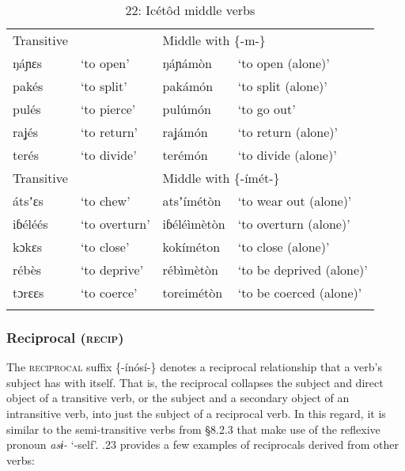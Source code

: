\begin{table}
\caption{22: Icétôd middle verbs}
\label{tab:8}


\begin{tabularx}{\textwidth}{XXXX}
\lsptoprule

Transitive &  & \multicolumn{2}{X}{Middle with \{-m-\}}\\
ŋáɲɛs & ‘to open’ & ŋáɲámòn & ‘to open (alone)’\\
pakés & ‘to split’ & pakámón & ‘to split (alone)’\\
pulés & ‘to pierce’ & pulúmón & ‘to go out’\\
raʝés & ‘to return’ & raʝámón & ‘to return (alone)’\\
terés & ‘to divide’ & terémón & ‘to divide (alone)’\\
Transitive &  & \multicolumn{2}{X}{Middle with \{-ímét-\}}\\
átsʼɛs & ‘to chew’ & atsʼímétòn & ‘to wear out (alone)’\\
iɓéléés & ‘to overturn’ & iɓéléìmètòn & ‘to overturn (alone)’\\
kɔkɛs & ‘to close’ & kokíméton & ‘to close (alone)’\\
rébès & ‘to deprive’ & rébìmètòn & ‘to be deprived (alone)’\\
tɔrɛɛs & \multicolumn{1}{X}{‘to coerce’} & toreimétòn & ‘to be coerced (alone)’\\
\lspbottomrule
\end{tabularx}
\end{table}

\subsubsection{Reciprocal (\textsc{recip})}

The \textsc{reciprocal} suffix \{-ínósí-\} denotes a reciprocal relationship that a verb’s subject has with itself. That is, the reciprocal collapses the subject and direct object of a transitive verb, or the subject and a secondary object of an intransitive verb, into just the subject of a reciprocal verb. In this regard, it is similar to the semi-transitive verbs from §8.2.3 that make use of the reflexive pronoun \textit{asɨ-} ‘-self’. .23 provides a few examples of reciprocals derived from other verbs:


